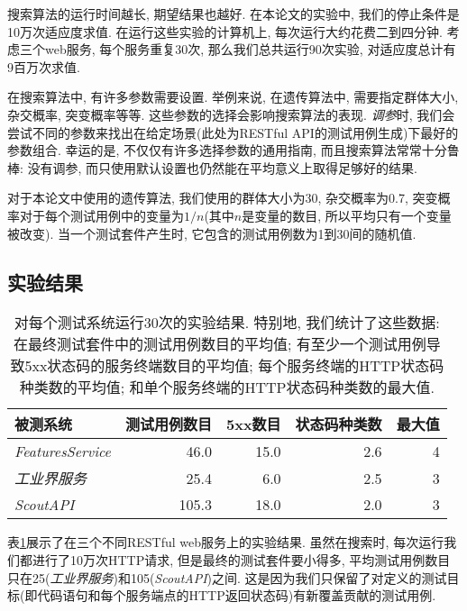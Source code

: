         搜索算法的运行时间越长, 期望结果也越好. 在本论文的实验中, 我们的停止条件是10万次适应度求值. 在运行这些实验的计算机上, 每次运行大约花费二到四分钟. 考虑三个web服务, 每个服务重复30次, 那么我们总共运行90次实验, 对适应度总计有9百万次求值. 
        
        在搜索算法中, 有许多参数需要设置. 举例来说, 在遗传算法中, 需要指定群体大小, 杂交概率, 突变概率等等. 这些参数的选择会影响搜索算法的表现. \textit{调参}时, 我们会尝试不同的参数来找出在给定场景(此处为RESTful API的测试用例生成)下最好的参数组合. 幸运的是, 不仅仅有许多选择参数的通用指南, 而且搜索算法常常十分鲁棒: 没有调参, 而只使用默认设置也仍然能在平均意义上取得足够好的结果. 
        
        对于本论文中使用的遗传算法, 我们使用的群体大小为30, 杂交概率为0.7, 突变概率对于每个测试用例中的变量为$1/n$(其中$n$是变量的数目, 所以平均只有一个变量被改变). 当一个测试套件产生时, 它包含的测试用例数为1到30间的随机值. 
    
    \subsection{实验结果}
    \label{5-3}
    
    \begin{table}
      \small
        \centering
      \begin{tabular}{lrrrr}
          \toprule
            被测系统 & 测试用例数目 & 5xx数目 & 状态码种类数 & 最大值 \\
            \midrule
            \textit{FeaturesService} & 46.0 & 15.0 & 2.6 & 4 \\
            \textit{工业界服务} & 25.4 & 6.0 & 2.5 & 3 \\
            \textit{ScoutAPI} & 105.3 & 18.0 & 2.0 & 3 \\
            \bottomrule
        \end{tabular}
        \caption[]{对每个测试系统运行30次的实验结果. 特别地, 我们统计了这些数据: 在最终测试套件中的测试用例数目的平均值; 有至少一个测试用例导致5xx状态码的服务终端数目的平均值; 每个服务终端的HTTP状态码种类数的平均值; 和单个服务终端的HTTP状态码种类数的最大值.}
      \label{table2}
    \end{table}
    
      表\ref{table2}展示了在三个不同RESTful web服务上的实验结果. 虽然在搜索时, 每次运行我们都进行了10万次HTTP请求, 但是最终的测试套件要小得多, 平均测试用例数目只在25(\textit{工业界服务})和105(\textit{ScoutAPI})之间. 这是因为我们只保留了对定义的测试目标(即代码语句和每个服务端点的HTTP返回状态码)有新覆盖贡献的测试用例.
    

